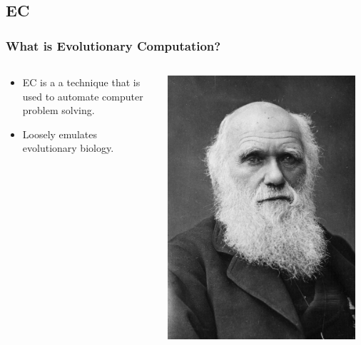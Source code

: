 \documentclass{beamer}
\begin{document}
\subsection[EC]{EC}

\begin{frame}
  \frametitle{What is Evolutionary Computation?}
  \begin{columns}
  \begin{column}{0.6\textwidth}
  \begin{itemize}
  	\item EC is a a technique that is used to automate computer problem solving.
  	\item Loosely emulates evolutionary biology.
  \end{itemize}
  \end{column}
  \begin{column}{0.4\textwidth}
   \includegraphics[width=0.95\textwidth]{Illustrations/darwin.jpg}
       \\
  \end{column}
  \end{columns}
\end{frame}
\end{document}

